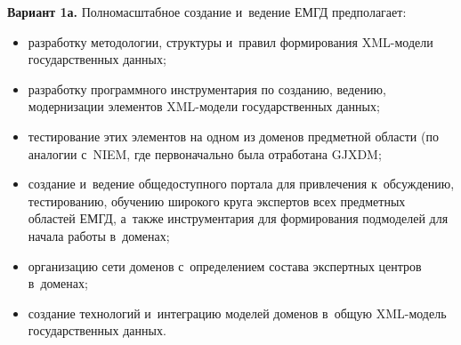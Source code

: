 \begin{multicols}{2}
\textbf{Вариант 1а.} Полномасштабное создание и~ведение \mbox{ЕМГД} 
предполагает:
\begin{itemize}
\item разработку методологии, структуры и~правил формирования XML-мо\-де\-ли государственных данных;\\[-14.5pt]
\item разработку программного инструментария по созданию, ведению, 
модернизации элементов XML-мо\-де\-ли государственных данных;\\[-14.5pt]
\item тестирование этих элементов на одном из доменов пред\-мет\-ной об\-ласти 
(по аналогии с~\mbox{NIEM}, где первоначально была отработана  GJXDM;\\[-14.5pt]
\item создание и~ведение общедоступного портала для привлечения 
к~об\-суж\-де\-нию, тестированию, обуче\-нию широкого круга экспертов всех 
пред\-мет\-ных областей \mbox{ЕМГД}, а~так\-же инструментария для формирования 
подмоделей для начала работы в~доменах;\\[-14.5pt]
\item организацию сети доменов с~определением со\-ста\-ва экспертных 
цент\-ров в~доменах;\\[-14.5pt]
\item создание технологий и~интеграцию моделей доменов в~общую  
XML-мо\-дель государственных данных.
\end{itemize}


\end{multicols}
